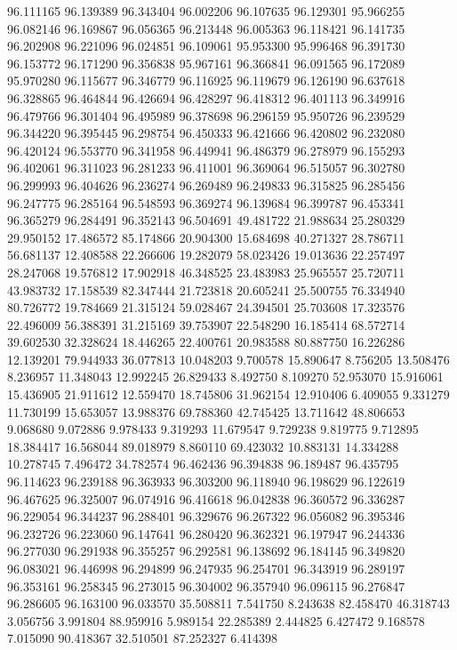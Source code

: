 96.111165
96.139389
96.343404
96.002206
96.107635
96.129301
95.966255
96.082146
96.169867
96.056365
96.213448
96.005363
96.118421
96.141735
96.202908
96.221096
96.024851
96.109061
95.953300
95.996468
96.391730
96.153772
96.171290
96.356838
95.967161
96.366841
96.091565
96.172089
95.970280
96.115677
96.346779
96.116925
96.119679
96.126190
96.637618
96.328865
96.464844
96.426694
96.428297
96.418312
96.401113
96.349916
96.479766
96.301404
96.495989
96.378698
96.296159
95.950726
96.239529
96.344220
96.395445
96.298754
96.450333
96.421666
96.420802
96.232080
96.420124
96.553770
96.341958
96.449941
96.486379
96.278979
96.155293
96.402061
96.311023
96.281233
96.411001
96.369064
96.515057
96.302780
96.299993
96.404626
96.236274
96.269489
96.249833
96.315825
96.285456
96.247775
96.285164
96.548593
96.369274
96.139684
96.399787
96.453341
96.365279
96.284491
96.352143
96.504691
49.481722
21.988634
25.280329
29.950152
17.486572
85.174866
20.904300
15.684698
40.271327
28.786711
56.681137
12.408588
22.266606
19.282079
58.023426
19.013636
22.257497
28.247068
19.576812
17.902918
46.348525
23.483983
25.965557
25.720711
43.983732
17.158539
82.347444
21.723818
20.605241
25.500755
76.334940
80.726772
19.784669
21.315124
59.028467
24.394501
25.703608
17.323576
22.496009
56.388391
31.215169
39.753907
22.548290
16.185414
68.572714
39.602530
32.328624
18.446265
22.400761
20.983588
80.887750
16.226286
12.139201
79.944933
36.077813
10.048203
9.700578
15.890647
8.756205
13.508476
8.236957
11.348043
12.992245
26.829433
8.492750
8.109270
52.953070
15.916061
15.436905
21.911612
12.559470
18.745806
31.962154
12.910406
6.409055
9.331279
11.730199
15.653057
13.988376
69.788360
42.745425
13.711642
48.806653
9.068680
9.072886
9.978433
9.319293
11.679547
9.729238
9.819775
9.712895
18.384417
16.568044
89.018979
8.860110
69.423032
10.883131
14.334288
10.278745
7.496472
34.782574
96.462436
96.394838
96.189487
96.435795
96.114623
96.239188
96.363933
96.303200
96.118940
96.198629
96.122619
96.467625
96.325007
96.074916
96.416618
96.042838
96.360572
96.336287
96.229054
96.344237
96.288401
96.329676
96.267322
96.056082
96.395346
96.232726
96.223060
96.147641
96.280420
96.362321
96.197947
96.244336
96.277030
96.291938
96.355257
96.292581
96.138692
96.184145
96.349820
96.083021
96.446998
96.294899
96.247935
96.254701
96.343919
96.289197
96.353161
96.258345
96.273015
96.304002
96.357940
96.096115
96.276847
96.286605
96.163100
96.033570
35.508811
7.541750
8.243638
82.458470
46.318743
3.056756
3.991804
88.959916
5.989154
22.285389
2.444825
6.427472
9.168578
7.015090
90.418367
32.510501
87.252327
6.414398
